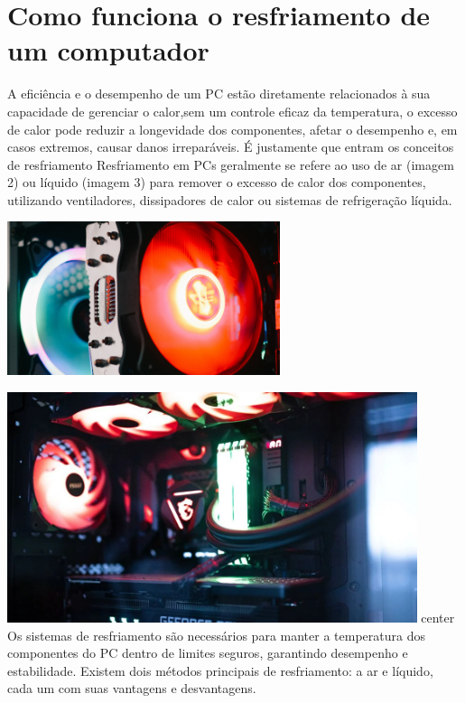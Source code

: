 \documentclass{article}
\begin{document}
\section{Como funciona o resfriamento de um computador}
A eficiência e o desempenho de um PC estão diretamente relacionados à sua capacidade de gerenciar o calor,sem um controle eficaz da temperatura, o excesso de calor pode reduzir a longevidade dos componentes, afetar o desempenho e, em casos extremos, causar danos irreparáveis. É justamente que entram os conceitos de resfriamento
Resfriamento em PCs geralmente se refere ao uso de ar (imagem 2) ou líquido (imagem 3) para remover o excesso de calor dos componentes, utilizando ventiladores, dissipadores de calor ou sistemas de refrigeração líquida.
\begin{adjustbox}{center,caption={ },nofloat=figure,vspace=\bigskipamount}
    \includegraphics[width=8cm]{cooler.png}

\end{adjustbox}
\begin{adjustbox}{center,caption={ },nofloat=figure,vspace=\bigskipamount}
    \includegraphics[width=12cm]{gaymer.png}
\end{adjustbox}{center}
Os sistemas de resfriamento são necessários para manter a temperatura dos componentes do PC dentro de limites seguros, garantindo desempenho e estabilidade. Existem dois métodos principais de resfriamento: a ar e líquido, cada um com suas vantagens e desvantagens.
\end{document}
